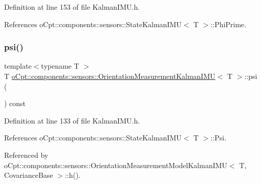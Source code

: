 Definition at line 153 of file Kalman\+I\+M\+U.\+h.



References o\+Cpt\+::components\+::sensors\+::\+State\+Kalman\+I\+M\+U$<$ T $>$\+::\+Phi\+Prime.

\hypertarget{classo_cpt_1_1components_1_1sensors_1_1_orientation_measurement_kalman_i_m_u_a3f9154bd8fe98787504823afd14ec2f0}{}\label{classo_cpt_1_1components_1_1sensors_1_1_orientation_measurement_kalman_i_m_u_a3f9154bd8fe98787504823afd14ec2f0} 
\subsubsection{\texorpdfstring{psi()}{psi()}\hspace{0.1cm}{\footnotesize\ttfamily [1/2]}}
{\footnotesize\ttfamily template$<$typename T $>$ \\
T \hyperlink{classo_cpt_1_1components_1_1sensors_1_1_orientation_measurement_kalman_i_m_u}{o\+Cpt\+::components\+::sensors\+::\+Orientation\+Measurement\+Kalman\+I\+MU}$<$ T $>$\+::psi (\begin{DoxyParamCaption}{ }\end{DoxyParamCaption}) const\hspace{0.3cm}{\ttfamily [inline]}}



Definition at line 133 of file Kalman\+I\+M\+U.\+h.



References o\+Cpt\+::components\+::sensors\+::\+State\+Kalman\+I\+M\+U$<$ T $>$\+::\+Psi.



Referenced by o\+Cpt\+::components\+::sensors\+::\+Orientation\+Measurement\+Model\+Kalman\+I\+M\+U$<$ T, Covariance\+Base $>$\+::h().

